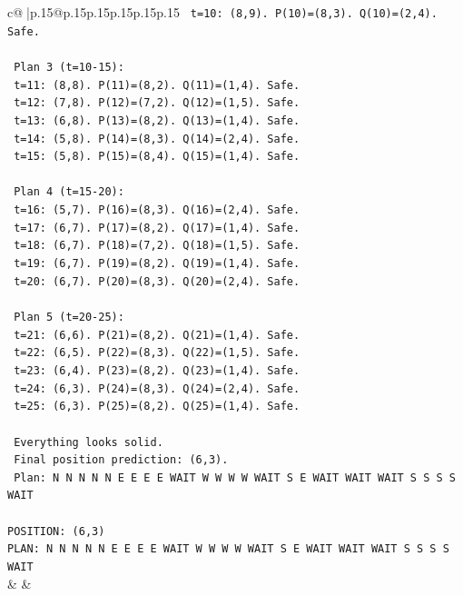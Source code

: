 \documentclass{article}
\begin{document}
{\begin{supertabular}{c@{$\;$}|p{.15\linewidth}@{}p{.15\linewidth}p{.15\linewidth}p{.15\linewidth}p{.15\linewidth}p{.15\linewidth}}
{{{\texttt{   t=10: (8,9). P(10)=(8,3). Q(10)=(2,4). Safe.} \\
\\ 
\texttt{   Plan 3 (t=10{-}15):} \\
\texttt{   t=11: (8,8). P(11)=(8,2). Q(11)=(1,4). Safe.} \\
\texttt{   t=12: (7,8). P(12)=(7,2). Q(12)=(1,5). Safe.} \\
\texttt{   t=13: (6,8). P(13)=(8,2). Q(13)=(1,4). Safe.} \\
\texttt{   t=14: (5,8). P(14)=(8,3). Q(14)=(2,4). Safe.} \\
\texttt{   t=15: (5,8). P(15)=(8,4). Q(15)=(1,4). Safe.} \\
\\ 
\texttt{   Plan 4 (t=15{-}20):} \\
\texttt{   t=16: (5,7). P(16)=(8,3). Q(16)=(2,4). Safe.} \\
\texttt{   t=17: (6,7). P(17)=(8,2). Q(17)=(1,4). Safe.} \\
\texttt{   t=18: (6,7). P(18)=(7,2). Q(18)=(1,5). Safe.} \\
\texttt{   t=19: (6,7). P(19)=(8,2). Q(19)=(1,4). Safe.} \\
\texttt{   t=20: (6,7). P(20)=(8,3). Q(20)=(2,4). Safe.} \\
\\ 
\texttt{   Plan 5 (t=20{-}25):} \\
\texttt{   t=21: (6,6). P(21)=(8,2). Q(21)=(1,4). Safe.} \\
\texttt{   t=22: (6,5). P(22)=(8,3). Q(22)=(1,5). Safe.} \\
\texttt{   t=23: (6,4). P(23)=(8,2). Q(23)=(1,4). Safe.} \\
\texttt{   t=24: (6,3). P(24)=(8,3). Q(24)=(2,4). Safe.} \\
\texttt{   t=25: (6,3). P(25)=(8,2). Q(25)=(1,4). Safe.} \\
\\ 
\texttt{   Everything looks solid.} \\
\texttt{   Final position prediction: (6,3).} \\
\texttt{   Plan: N N N N N E E E E WAIT W W W W WAIT S E WAIT WAIT WAIT S S S S WAIT} \\
\\ 
\texttt{POSITION: (6,3)} \\
\texttt{PLAN: N N N N N E E E E WAIT W W W W WAIT S E WAIT WAIT WAIT S S S S WAIT} \\
            }
        }
    }
    & & \\ \\


\end{supertabular}}
\end{document}
